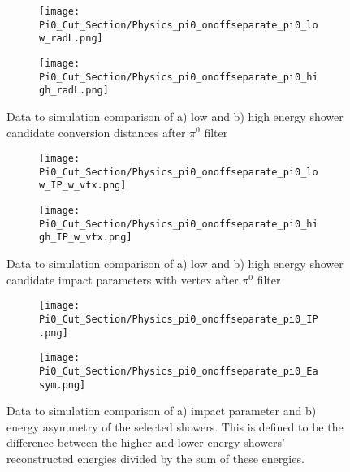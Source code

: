 \begin{figure}[t!]
\centering
  \begin{subfigure}[t]{0.3\textwidth}
    \centering
\texttt{[image: Pi0\_Cut\_Section/Physics\_pi0\_onoffseparate\_pi0\_low\_radL.png]}
  \caption{ }
  \end{subfigure} 
  \hspace{30mm}
  \begin{subfigure}[t]{0.3\textwidth}
    \centering
\texttt{[image: Pi0\_Cut\_Section/Physics\_pi0\_onoffseparate\_pi0\_high\_radL.png]}
  \caption{ }
  \end{subfigure} 
\label{fig:physics_pi0_pi0_rl}
\caption{ Data to simulation comparison of a) low and b) high energy shower candidate conversion distances  after $\pi^0$ filter }
\end{figure}

\begin{figure}[h!]
\centering
  \begin{subfigure}[t]{0.3\textwidth}
    \centering
\texttt{[image: Pi0\_Cut\_Section/Physics\_pi0\_onoffseparate\_pi0\_low\_IP\_w\_vtx.png]}
  \caption{ }
  \end{subfigure} 
  \hspace{30mm}
  \begin{subfigure}[t]{0.3\textwidth}
    \centering
\texttt{[image: Pi0\_Cut\_Section/Physics\_pi0\_onoffseparate\_pi0\_high\_IP\_w\_vtx.png]}
  \caption{ }
  \end{subfigure} 
\label{fig:physics_pi0_pi0_IP_w_vtx}
\caption{ Data to simulation comparison of a) low and b) high energy shower candidate impact parameters with vertex after $\pi^0$ filter }
\end{figure}

\begin{figure}[h!]
\centering
  \begin{subfigure}[t]{0.3\textwidth}
    \centering
\texttt{[image: Pi0\_Cut\_Section/Physics\_pi0\_onoffseparate\_pi0\_IP.png]}
  \caption{ }
  \end{subfigure} 
  \hspace{30mm}
  \begin{subfigure}[t]{0.3\textwidth}
    \centering
\texttt{[image: Pi0\_Cut\_Section/Physics\_pi0\_onoffseparate\_pi0\_Easym.png]}
  \caption{ }
  \end{subfigure} 
\label{fig:physics_pi0_pi0_IP}
\caption{ Data to simulation comparison of a) impact parameter and b) energy asymmetry of the selected showers. This is defined to be the difference between the higher and lower energy showers' reconstructed energies divided by the sum of these energies. }
\end{figure}

